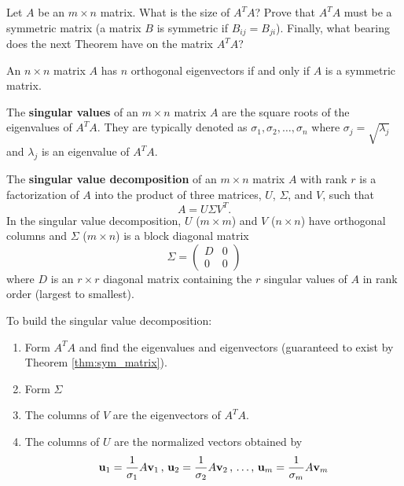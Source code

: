\begin{problem}
    Let $A$ be an $m \times n$ matrix.  What is the size of $A^T A$?  Prove that $A^T A$
    must be a symmetric matrix (a matrix $B$ is symmetric if $B_{ij} = B_{ji}$).  Finally, what bearing
    does the next Theorem have on the matrix $A^T A$?
\end{problem}




\begin{thm}\label{thm:sym_matrix}
    An $n \times n$ matrix $A$ has $n$ orthogonal eigenvectors if and only if $A$ is a
    symmetric matrix.
\end{thm}


\begin{definition}
The {\bf singular values} of an $m \times n$ matrix $A$ are the square roots of the
eigenvalues of $A^T A$.
They are typically denoted as $\sigma_1, \sigma_2, \dots, \sigma_n$ where $\sigma_j =
\sqrt{\lambda_j}$ and $\lambda_j$ is an eigenvalue of $A^T A$.  
\end{definition}

\begin{definition}
    The {\bf singular value decomposition} of an $m \times n$ matrix $A$ with rank $r$ is
    a factorization of $A$ into the product of three matrices, $U$, $\Sigma$, and $V$,
    such that
    \[ A = U \Sigma V^T. \]
    In the singular value decomposition, $U$ ($m \times m$) and $V$ ($n \times n$) have
    orthogonal columns and $\Sigma$ ($m \times n$)
    is a block diagonal matrix 
    \[ \Sigma = \begin{pmatrix} D & 0 \\ 0 & 0 \end{pmatrix} \]
    where $D$ is an $r \times r$ diagonal matrix containing the $r$ singular values of
    $A$ in rank order (largest to smallest).

    To build the singular value decomposition:
    \begin{enumerate}
        \item Form $A^TA$ and find the eigenvalues and eigenvectors (guaranteed to exist
            by Theorem \ref{thm:sym_matrix}).
        \item Form $\Sigma$
        \item The columns of $V$ are the eigenvectors of $A^T A$.
        \item The columns of $U$ are the normalized vectors obtained by 
            \[ {\bf u}_1 = \frac{1}{\sigma_1} A {\bf v}_1\, , \, {\bf u}_2 = \frac{1}{\sigma_2} A
            {\bf v}_2 \, , \, \dots, \, {\bf u}_m = \frac{1}{\sigma_m} A {\bf v}_m \]
    \end{enumerate}
\end{definition}

